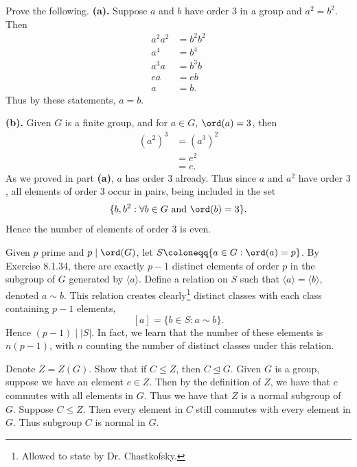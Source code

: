 \begin{problem}[Exercise 3]{
    Prove the following.
}
    \textbf{(a).}
    Suppose $a$ and $b$ have order $3$ in a group and $a^2 = b^2$.
    Then
    \begin{align*}
        a^2 a^2 &= b^2 b^2\\
        a^4 &= b^4\\
        a^3 a &= b^3 b\\
        ea &= eb\\
        a &= b.
    \end{align*}
    Thus by these statements, $a = b$.

    \textbf{(b).}
    Given $G$ is a finite group, and for $a \in G$, $\ord(a) = 3$, then
    \begin{align*}
    (a^2)^3 &= (a^3)^2\\
        &= e^2\\
        &= e.
    \end{align*}
    As we proved in part \textbf{(a)}, $a$ has order $3$ already.
    Thus since $a$ and $a^2$ have order $3$, all elements of order $3$ occur in pairs, being included in the set
    \[
        \{b,b^2 : \forall b \in G \text{ and } \ord(b) = 3\}.
    \]
    Hence the number of elements of order $3$ is even.
\end{problem}

\begin{problem}[Exercise 4]{
    Given $p$ prime and $p \mid \ord(G)$, let $S \coloneqq \{a \in G : \ord(a) = p\}$.
}
    By Exercise 8.1.34, there are exactly $p-1$ distinct elements of order $p$ in the subgroup of $G$ generated by $\langle a \rangle$.
    Define a relation on $S$ such that $\langle a \rangle = \langle b \rangle$, denoted $a \sim b$.
    This relation creates clearly\footnote{Allowed to state by Dr. Chastkofsky.} distinct classes with each class containing $p-1$ elements,
    \[
        [a] = \{b \in S : a \sim b\}.
    \]
    Hence $(p-1) \mid |S|$.
    In fact, we learn that the number of these elements is $n(p-1)$, with $n$ counting the number of distinct classes under this relation.
\end{problem}

\begin{problem}[Exercise 5]{
    Denote $Z = Z(G)$.
    Show that if $C \leq Z$, then $C \trianglelefteq G$.
}
    Given $G$ is a group, suppose we have an element $c \in Z$.
    Then by the definition of $Z$, we have that $c$ commutes with all elements in $G$.
    Thus we have that $Z$ is a normal subgroup of $G$.
    Suppose $C \leq Z$.
    Then every element in $C$ still commutes with every element in $G$.
    Thus subgroup $C$ is normal in $G$.
\end{problem}

